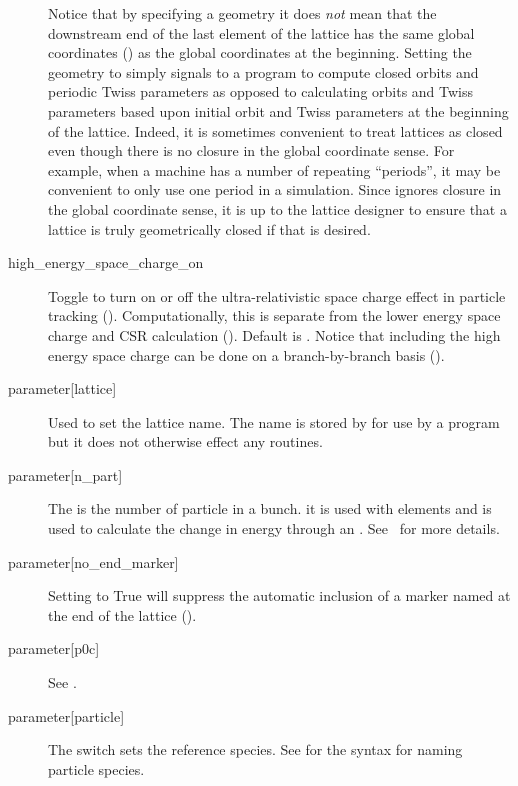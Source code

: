 \begin{description}
Notice that by specifying a  geometry it does {\em not} mean that the downstream end of
the last element of the lattice has the same global coordinates () as the global
coordinates at the beginning. Setting the geometry to  simply signals to a program to
compute closed orbits and periodic Twiss parameters as opposed to calculating orbits and Twiss
parameters based upon initial orbit and Twiss parameters at the beginning of the lattice.  Indeed,
it is sometimes convenient to treat lattices as closed even though there is no closure in the global
coordinate sense. For example, when a machine has a number of repeating ``periods'', it may be
convenient to only use one period in a simulation. Since \bmad ignores closure in the global
coordinate sense, it is up to the lattice designer to ensure that a lattice is truly geometrically
closed if that is desired.
%
\item[{high_energy_space_charge_on}] \Newline
Toggle to turn on or off the ultra-relativistic space charge effect in particle tracking
(). Computationally, this is separate from the lower energy space charge and
CSR calculation (). Default is . Notice that including the high energy space
charge can be done on a branch-by-branch basis ().
%
  \item[{parameter[lattice]}] \Newline
Used to set the lattice name. The  name is stored by \bmad for use by a program but it
does not otherwise effect any \bmad routines.
%
  \item[{parameter[n_part]}] \Newline
The  is the number of particle in a bunch.  it is used with 
elements and is used to calculate the change in energy through an . See~
for more details.
%
  \item[{parameter[no_end_marker]}] \Newline
Setting  to True will suppress the automatic inclusion
of a marker named  at the end of the lattice (). 
%
  \item[{parameter[p0c]}] \Newline
See .
%
  \item[{parameter[particle]}] \Newline
The  switch sets the reference species. See  for the
syntax for naming particle species.


\end{description}
